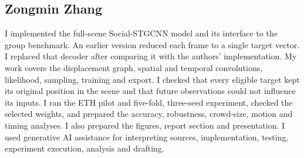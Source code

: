 \subsection*{Zongmin Zhang}
I implemented the full-scene Social-STGCNN model and its interface to the group benchmark. An earlier version reduced each frame to a single target vector. I replaced that decoder after comparing it with the authors' implementation. My work covers the displacement graph, spatial and temporal convolutions, likelihood, sampling, training and export. I checked that every eligible target kept its original position in the scene and that future observations could not influence its inputs. I ran the ETH pilot and five-fold, three-seed experiment, checked the selected weights, and prepared the accuracy, robustness, crowd-size, motion and timing analyses. I also prepared the figures, report section and presentation. I used generative AI assistance for interpreting sources, implementation, testing, experiment execution, analysis and drafting.
